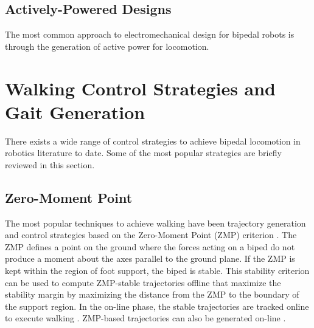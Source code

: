 \subsection{Actively-Powered Designs} %
\label{sub:related_active_designs}
The most common approach to electromechanical design for bipedal robots is through the generation of active power for locomotion. 








\section{Walking Control Strategies and Gait Generation} %
\label{sec:related_control_strategies}
There exists a wide range of control strategies to achieve bipedal locomotion in robotics literature to date. Some of the most popular strategies are briefly reviewed in this section.


\subsection{Zero-Moment Point} %
\label{sub:related_zero_moment_point}
The most popular techniques to achieve walking have been trajectory generation and control strategies based on the Zero-Moment Point (ZMP) criterion \cite{Vukobratovic:2004wy}. The ZMP defines a point on the ground where the forces acting on a biped do not produce a moment about the axes parallel to the ground plane. If the ZMP is kept within the region of foot support, the biped is stable. This stability criterion can be used to compute ZMP-stable trajectories offline that maximize the stability margin by maximizing the distance from the ZMP to the boundary of the support region. In the on-line phase, the stable trajectories are tracked online to execute walking \cite{HuangEtAlTRA2001}.  ZMP-based trajectories can also be generated on-line \cite{KajitaEtAlICRA2003,TakenakaEtAlIROS2009}. 

